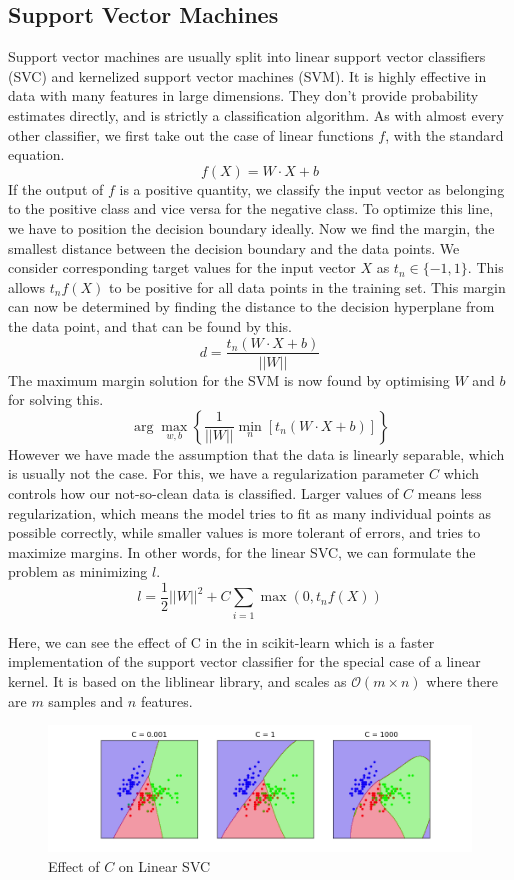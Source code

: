 \documentclass{article}
\newcommand{\code}[1]{{\fontfamily{zi4} \selectfont{#1}}}
\begin{document}
\subsection{Support Vector Machines}
Support vector machines are usually split into linear support vector classifiers (SVC) and kernelized support vector machines (SVM). It is highly effective in data with many features in large dimensions. They don't provide probability estimates directly, and is strictly a classification algorithm. As with almost every other classifier, we first take out the case of linear functions $f$, with the standard equation.
$$f(X) = W \cdot X + b$$
If the output of $f$ is a positive quantity, we classify the input vector as belonging to the positive class and vice versa for the negative class. To optimize this line, we have to position the decision boundary ideally.
Now we find the margin, the smallest distance between the decision boundary and the data points. We consider corresponding target values for the input vector $X$ as $t_n \in \{-1, 1\}$.  This allows $t_n f(X)$ to be positive for all data points in the training set. This margin can now be determined by finding the distance to the decision hyperplane from the data point, and that can be found by this.
$$d = \frac{t_n (W \cdot X + b)}{||W||}$$
The maximum margin solution for the SVM is now found by optimising $W$ and $b$ for solving this.
$$\arg \max_{w, b} \left\lbrace \frac{1}{||W||} \min_{n} [t_n (W \cdot X + b)] \right\rbrace$$
However we have made the assumption that the data is linearly separable, which is usually not the case. For this, we have a regularization parameter $C$ which controls how our not-so-clean data is classified. Larger values of $C$ means less regularization, which means the model tries to fit as many individual points as possible correctly, while smaller values is more tolerant of errors, and tries to maximize margins. In other words, for the linear SVC, we can formulate the problem as minimizing $l$.
$$l = \frac{1}{2} ||W||^2 + C \sum_{i=1} \max(0, t_n f(X))$$

Here, we can see the effect of C in the \code{LinearSVC} in scikit-learn which is a faster implementation of the support vector classifier for the special case of a linear kernel. It is based on the liblinear library, and scales as $\mathcal{O}(m \times n)$ where there are $m$ samples and $n$ features. 

\begin{figure}[H]
\includegraphics[width=\linewidth]{Images/linear_svm_C.png}
\centering
\caption{Effect of $C$ on Linear SVC}
\end{figure}
\end{document}
